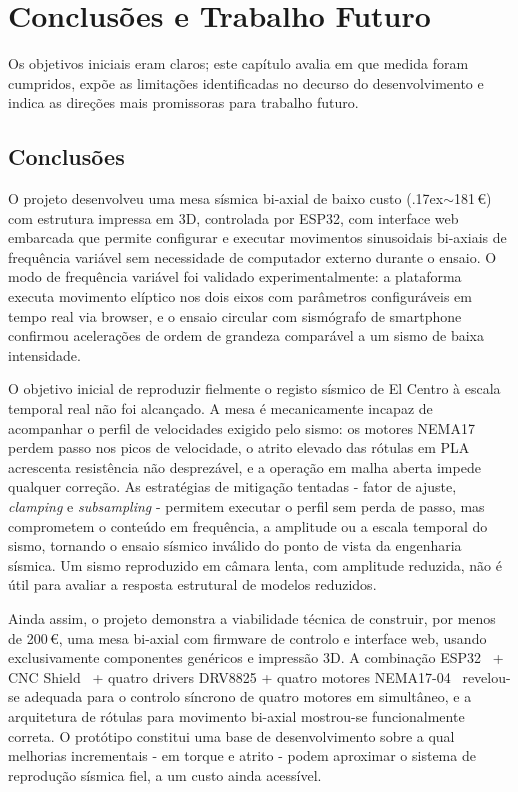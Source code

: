 \chapter{Conclusões e Trabalho Futuro}
\label{chapter:conclusions}

\begin{introduction}
Os objetivos iniciais eram claros; este capítulo avalia em que medida foram cumpridos, expõe as limitações identificadas no decurso do desenvolvimento e indica as direções mais promissoras para trabalho futuro.
\end{introduction}

\section{Conclusões}
\label{sec:conclusoes}

O projeto desenvolveu uma mesa sísmica bi-axial de baixo custo ({\raise.17ex\hbox{$\scriptstyle\sim$}}181\,\euro{}) com estrutura impressa em 3D, controlada por ESP32, com interface web embarcada que permite configurar e executar movimentos sinusoidais bi-axiais de frequência variável sem necessidade de computador externo durante o ensaio. O modo de frequência variável foi validado experimentalmente: a plataforma executa movimento elíptico nos dois eixos com parâmetros configuráveis em tempo real via browser, e o ensaio circular com sismógrafo de smartphone confirmou acelerações de ordem de grandeza comparável a um sismo de baixa intensidade.

O objetivo inicial de reproduzir fielmente o registo sísmico de El Centro à escala temporal real não foi alcançado. A mesa é mecanicamente incapaz de acompanhar o perfil de velocidades exigido pelo sismo: os motores NEMA17 perdem passo nos picos de velocidade, o atrito elevado das rótulas em PLA acrescenta resistência não desprezável, e a operação em malha aberta impede qualquer correção. As estratégias de mitigação tentadas - fator de ajuste, \textit{clamping} e \textit{subsampling} - permitem executar o perfil sem perda de passo, mas comprometem o conteúdo em frequência, a amplitude ou a escala temporal do sismo, tornando o ensaio sísmico inválido do ponto de vista da engenharia sísmica. Um sismo reproduzido em câmara lenta, com amplitude reduzida, não é útil para avaliar a resposta estrutural de modelos reduzidos.

Ainda assim, o projeto demonstra a viabilidade técnica de construir, por menos de 200\,\euro{}, uma mesa bi-axial com firmware de controlo e interface web, usando exclusivamente componentes genéricos e impressão 3D. A combinação ESP32~\cite{JoyITESP32} + CNC Shield~\cite{JoyITCNCKit2} + quatro drivers DRV8825 + quatro motores NEMA17-04~\cite{JoyITNEMA17} revelou-se adequada para o controlo síncrono de quatro motores em simultâneo, e a arquitetura de rótulas para movimento bi-axial mostrou-se funcionalmente correta. O protótipo constitui uma base de desenvolvimento sobre a qual melhorias incrementais - em torque e atrito - podem aproximar o sistema de reprodução sísmica fiel, a um custo ainda acessível.


